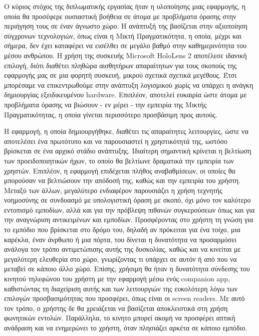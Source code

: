 Ο κύριος στόχος της διπλωματικής εργασίας ήταν η υλοποίησης μιας εφαρμογής, η οποία θα προσέφερε ουσιαστική βοήθεια σε άτομα με προβλήματα όρασης	στην περιήγηση τους σε έναν άγνωστο χώρο. Η ανάπτυξή της βασίζεται στην αξιοποίηση σύγχρονων τεχνολογιών, όπως είναι η Μικτή Πραγματικότητα, η οποία, μέχρι και σήμερα, δεν έχει καταφέρει να εισέλθει σε μεγάλο βαθμό στην καθημερινότητα του μέσου ανθρώπου. Η χρήση της συσκευής Microsoft HoloLens 2 αποτέλεσε ιδανική επιλογή, διότι διαθέτει πληθώρα αισθητήρων απαραίτητων για τους σκοπούς της εφαρμογής μας σε μια φορητή συσκευή, μικρού σχετικά σχετικά μεγέθους. Έτσι μπορέσαμε να επικεντρωθούμε στην ανάπτυξη λογισμικού χωρίς να υπάρχει η ανάγκη δημιουργίας εξειδικευμένου hardware. Επιπλέον, αποτελεί ευκαιρία ώστε άτομα με προβλήματα όρασης να βιώσουν - εν μέρει - την εμπειρία της Μικτής Πραγματικότητας, η οποία γίνεται περισσότερο προσβάσιμη προς αυτούς. %

Η εφαρμογή, η οποία δημιουργήθηκε, διαθέτει τις απαραίτητες λειτουργίες, ώστε να αποτελέσει ένα πρωτότυπο και να παρουσιαστεί η χρηστικότητά της, ωστόσο βρίσκεται σε ένα αρχικό στάδιο ανάπτυξης. Ιδιαίτερη σημαντική κρίνεται η βελτίωση των προειδοποιητικών ήχων, το οποίο θα βελτίωνε δραματικά την εμπειρία των χρηστών. Επιπλέον, η εφαρμογή επιδέχεται πλήθος αναβαθμίσεων, οι οποίες θα μπορούσαν να βελτιώσουν την απόδοσή της, καθώς και την εμπειρία του χρήστη. Μεταξύ των άλλων, μεγαλύτερο ενδιαφέρον παρουσιάζει η χρήση τεχνητής νοημοσύνης σε συνδυασμό με υπολογιστική όραση με σκοπό, όχι μόνο τον καλύτερο εντοπισμό εμποδίων, αλλά και για την πρόβλεψη πιθανών συγκερούσεων όπως και για την αναγνώριση αντικειμένων και εμποδίων. Προσφέροντας στο χρήστη τη γνώση για το εμπόδιο που βρίσκεται στο δρόμο του, δηλαδή αν πρόκειται για ένα τοίχο, μια καρέκλα, έναν άνρθωπο ή μια πόρτα, του δίνεται η δυνατότητα να προσαρμόσει ανάλογα τον τρόπο αντιμετώπισης αυτής της δυσκολίας, καθώς και να κινείται με μεγαλύτερη ελευθερία στο χώρο, γνωρίζοντας τι υπάρχει σε αυτόν ή από που να μεταβεί σε κάποιο άλλο χώρο. Επίσης, χρήσιμη θα ήταν η δυνατότητα σύνδεσης του κινητού τηλεφώνου του χρήστη με την εφαρμογή μέσω ενός companion app, καθιστώντας τη διαχείριση αυτής και των λειτουργιών της ευκολότερη λόγω των επιλογών προσβασιμότητας που προσφέρει, όπως είναι οι screen readers. Με αυτό τον τρόπο, ο χρήστης δε θα χρειάζεται να βασίζεται αποκλειστικά στη χρήση φωνητικών εντολών. Παράλληλα, το κινητο μπορεί ακομή να προσφέρει απτική ανάδραση και να ενημερώνει το χρήστη, όταν πλησιάζει αρκέτα σε κάποιο εμπόδιο.

